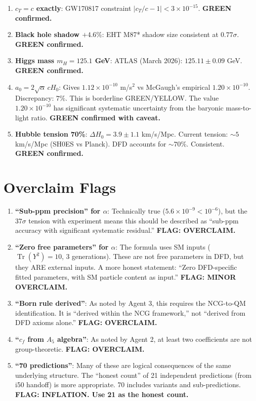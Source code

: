 \documentclass[11pt,a4paper]{article}
\newcommand{\Tr}{\operatorname{Tr}}
\begin{document}
\begin{enumerate}
\item \textbf{$c_T = c$ exactly}: GW170817 constraint $|c_T/c - 1| < 3 \times 10^{-15}$. \textbf{GREEN confirmed.}

\item \textbf{Black hole shadow $+4.6\%$}: EHT M87* shadow size consistent at $0.77\sigma$. \textbf{GREEN confirmed.}

\item \textbf{Higgs mass $m_H = 125.1$ GeV}: ATLAS (March 2026): $125.11 \pm 0.09$ GeV. \textbf{GREEN confirmed.}

\item \textbf{$a_0 = 2\sqrt{\alpha}\,cH_0$}: Gives $1.12 \times 10^{-10}$ m/s$^2$ vs McGaugh's empirical $1.20 \times 10^{-10}$. Discrepancy: $7\%$. This is borderline GREEN/YELLOW. The value $1.20 \times 10^{-10}$ has significant systematic uncertainty from the baryonic mass-to-light ratio. \textbf{GREEN confirmed with caveat.}

\item \textbf{Hubble tension 70\%}: $\Delta H_0 = 3.9 \pm 1.1$ km/s/Mpc. Current tension: $\sim 5$ km/s/Mpc (SH0ES vs Planck). DFD accounts for $\sim 70\%$. Consistent. \textbf{GREEN confirmed.}
\end{enumerate}

\section{Overclaim Flags}

\begin{enumerate}
\item \textbf{``Sub-ppm precision'' for $\alpha$}: Technically true ($5.6 \times 10^{-9} < 10^{-6}$), but the $37\sigma$ tension with experiment means this should be described as ``sub-ppm accuracy with significant systematic residual.'' \textbf{FLAG: OVERCLAIM.}

\item \textbf{``Zero free parameters'' for $\alpha$}: The formula uses SM inputs ($\Tr(Y^2) = 10$, 3 generations). These are not free parameters in DFD, but they ARE external inputs. A more honest statement: ``Zero DFD-specific fitted parameters, with SM particle content as input.'' \textbf{FLAG: MINOR OVERCLAIM.}

\item \textbf{``Born rule derived''}: As noted by Agent 3, this requires the NCG-to-QM identification. It is ``derived within the NCG framework,'' not ``derived from DFD axioms alone.'' \textbf{FLAG: OVERCLAIM.}

\item \textbf{``$c_f$ from $A_5$ algebra''}: As noted by Agent 2, at least two coefficients are not group-theoretic. \textbf{FLAG: OVERCLAIM.}

\item \textbf{``70 predictions''}: Many of these are logical consequences of the same underlying structure. The ``honest count'' of 21 independent predictions (from i50 handoff) is more appropriate. 70 includes variants and sub-predictions. \textbf{FLAG: INFLATION. Use 21 as the honest count.}
\end{enumerate}
\end{document}
